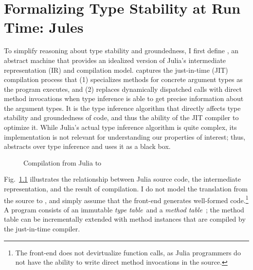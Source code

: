 \chapter{Formalizing Type Stability at Run Time: Jules}\label{sec:jules}
\label{chap:jules}

To simplify reasoning about type stability and groundedness, I first
define \jules, an abstract machine that provides an idealized version of
Julia's intermediate representation (IR) and compilation model.
\jules captures the just-in-time (JIT) compilation process that (1) specializes methods
for concrete argument types as the program executes, and (2) replaces dynamically
dispatched calls with direct method invocations when type inference
is able to get precise information about the argument types.
It is the type inference algorithm that directly affects
type stability and groundedness of code, and thus the ability of the JIT compiler
to optimize it. While Julia's actual type inference algorithm
is quite complex, its implementation is not relevant for understanding
our properties of interest; thus, \jules abstracts over type inference
and uses it as a black box.

\begin{figure}[h]
  \caption{Compilation from Julia to \jules}\label{comp}
\end{figure}

Fig.~\ref{comp} illustrates the relationship between Julia source code, the
\jules intermediate representation, and the result of compilation. I do not model
the translation from the source to \jules, and simply assume that the front-end
generates well-formed \jules code.\footnote{The front-end does not devirtualize
function calls, as Julia programmers do not have the ability to write direct
method invocations in the source.} A \jules program consists of an immutable \emph{type
table}~\tytbl and a \emph{method table}~\mtbl; the method table can be incrementally extended
with method instances that are compiled by the just-in-time compiler.

